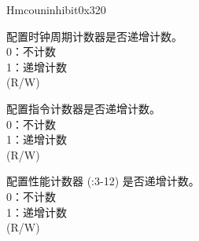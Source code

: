 \begin{register}{H}{mcouninhibit}{0x320}\label{regdesc:LPMCOUNTINHIBIT}
%
%
%
%
\regnewline%
\begin{regdesc}\begin{reglist}
\label{fielddesc:LPMCOUNTINHIBITCY}\item [CY] 配置时钟周期计数器是否递增计数。\\
0：不计数\\
1：递增计数\\
(R/W)
\label{fielddesc:LPMCOUNTINHIBITIR}\item [IR] 配置指令计数器是否递增计数。\\
0：不计数\\
1：递增计数\\
(R/W)\label{fielddesc:LPMCOUNTINHIBITHPM}\item [HPM] 配置性能计数器 (:3-12) 是否递增计数。\\
0：不计数\\
1：递增计数\\
(R/W)
\end{reglist}\end{regdesc}
\end{register}

